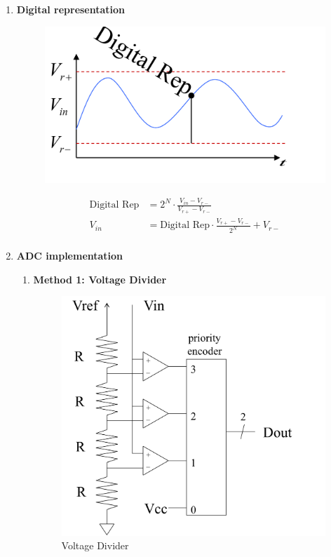 \documentclass[a4paper]{article}
\begin{document}
\begin{enumerate}[label = \arabic*.]
    \item \textbf{Digital representation}
      \begin{figure}[H]
        \centering
        \includegraphics[width=0.4\linewidth]{ADC_digital_representation.jpeg}
        \label{fig:ADC_digital_representation.jpeg}
      \end{figure}

      \begin{equation*}
        \begin{aligned}
          \text{Digital Rep} & = 2^N \cdot \frac{V_{in} - V_{r-} }{V_{r+} - V_{r-} }            \\
          V_{in}             & = \text{Digital Rep} \cdot \frac{V_{r+} - V_{r-} }{2^N} + V_{r-} \\
        \end{aligned}
      \end{equation*}

    \item \textbf{ADC implementation}
      \begin{enumerate}[label = \arabic*.]
        \item \textbf{Method 1: Voltage Divider}
          \begin{figure}[H]
            \centering
            \includegraphics[width=0.4\linewidth]{Voltage_divider.jpeg}
            \caption{Voltage Divider}
            \label{fig:Voltage_divider.jpeg}
          \end{figure}


\end{enumerate}
\end{enumerate}
\end{document}
